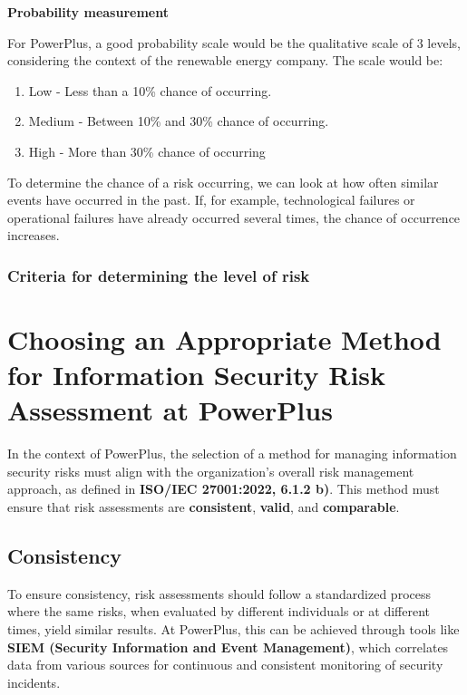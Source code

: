 \textbf{Probability measurement}

For PowerPlus, a good probability scale would be the qualitative scale of 3 levels, considering the context of the renewable energy company. The scale would be:

\begin{enumerate}
    \item Low - Less than a 10\% chance of occurring.
    \item Medium - Between 10\% and 30\% chance of occurring.
    \item High - More than 30\% chance of occurring
\end{enumerate}

To determine the chance of a risk occurring, we can look at how often similar events have occurred in the past. If, for example, technological failures or operational failures have already occurred several times, the chance of occurrence increases.

\subsubsection{Criteria for determining the level of risk}

\section{Choosing an Appropriate Method for Information Security Risk Assessment at PowerPlus}

In the context of PowerPlus, the selection of a method for managing information security risks must align with the organization's overall risk management approach, as defined in \textbf{ISO/IEC 27001:2022, 6.1.2 b)}. This method must ensure that risk assessments are \textbf{consistent}, \textbf{valid}, and \textbf{comparable}.

\subsection{Consistency}

To ensure consistency, risk assessments should follow a standardized process where the same risks, when evaluated by different individuals or at different times, yield similar results.  
At PowerPlus, this can be achieved through tools like \textbf{SIEM (Security Information and Event Management)}, which correlates data from various sources for continuous and consistent monitoring of security incidents.

